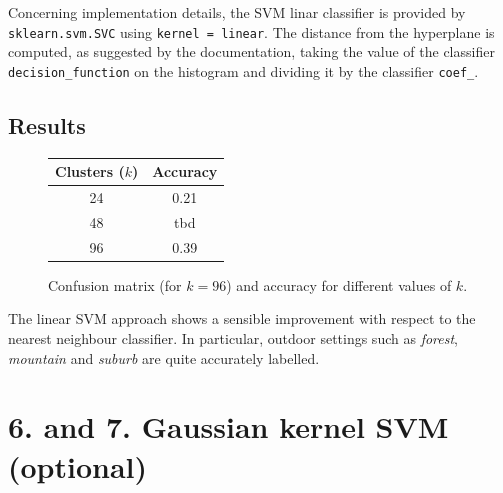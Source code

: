 \documentclass[12pt]{article}
\begin{document}
  Concerning implementation details, the SVM linar classifier is provided by \texttt{sklearn.svm.SVC} using \texttt{kernel = linear}. The distance from the hyperplane is computed, as suggested by the documentation, taking the value of the classifier \texttt{decision\_function} on the histogram and dividing it by the classifier \texttt{coef\_}.

  \subsection*{Results}

  \begin{figure}[H]
    \centering
    \caption*{Confusion matrix (for \( k = 96 \)) and accuracy for different values of \( k \).}
    \quad\quad\quad
    \begin{tabular}[b]{cc}
			\toprule
      Clusters (\( k \)) & Accuracy \\
      \midrule
      24  & 0.21 \\
      48  & tbd \\
      96  & 0.39 \\
      \bottomrule
    \end{tabular}
  \end{figure}

  The linear SVM approach shows a sensible improvement with respect to the nearest neighbour classifier. In particular, outdoor settings such as \textit{forest}, \textit{mountain} and \textit{suburb} are quite accurately labelled.
  



  \section*{6. and 7. Gaussian kernel SVM (optional)}
\end{document}

